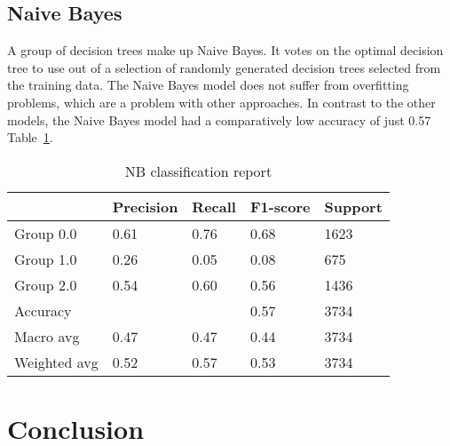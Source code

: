 \documentclass{article}
\begin{document}
\subsection{Naive Bayes}
A group of decision trees make up Naive Bayes. It votes on the optimal decision tree to use out of a selection of randomly generated decision trees selected from the training data. The Naive Bayes model does not suffer from overfitting problems, which are a problem with other approaches. In contrast to the other models, the Naive Bayes model had a comparatively low accuracy of just 0.57 Table~\ref{tab:updated_results_2}.


\begin{table}[htbp]
  \centering
  \caption{NB classification report}
  \begin{tabular}{|l|l|l|l|l|}
    \hline
                 & Precision & Recall & F1-score & Support \\ \hline
    Group 0.0    & 0.61      & 0.76   & 0.68     & 1623    \\ \hline
    Group 1.0    & 0.26      & 0.05   & 0.08     & 675     \\ \hline
    Group 2.0    & 0.54      & 0.60   & 0.56     & 1436    \\ \hline
    Accuracy     &           &        & 0.57     & 3734    \\ \hline
    Macro avg    & 0.47      & 0.47   & 0.44     & 3734    \\ \hline
    Weighted avg & 0.52      & 0.57   & 0.53     & 3734    \\ \hline
  \end{tabular}
  \label{tab:updated_results_2}
\end{table}

\section{Conclusion}
\end{document}
